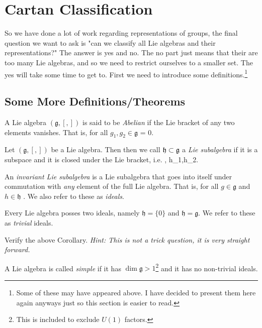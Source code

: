 \section{Cartan Classification}

So we have done a lot of work regarding representations of groups, the final question we want to ask is "can we classify all Lie algebras and their representations?" The answer is yes and no. The no part just means that their are too many Lie algebras, and so we need to restrict ourselves to a smaller set. The yes will take some time to get to. First we need to introduce some definitions.\footnote{Some of these may have appeared above. I have decided to present them here again anyways just so this section is easier to read.}

\subsection{Some More Definitions/Theorems}

    A Lie algebra $(\mathfrak{g},[,])$ is said to be \textit{Abelian} if the Lie bracket of any two elements vanishes. That is, for all $g_1,g_2\in\mathfrak{g}$
    \bse 
        [g_1,g_2] = 0.
    \ese 
\ed 

    Let $(\mathfrak{g},[,])$ be a Lie algebra. Then then we call $\mathfrak{h}\ss \mathfrak{g}$ a \textit{Lie subalgebra} if it is a subspace and it is closed under the Lie bracket, i.e. 
    \bse 
        [h_1,h_2] \in {}, \qquad \forall h_1,h_2\in{}.
    \ese
\ed

    An \textit{invariant Lie subalgebra} is a Lie subalgebra that goes into itself under commutation with \textit{any} element of the full Lie algebra. That is, for all $g\in \mathfrak{g}$ and $h\in\mathfrak{h}$
    \bse 
        [h,g] \in {}.
    \ese
    We also refer to these as \textit{ideals}.
\ed 

\bc 
    Every Lie algebra posses two ideals, namely $\mathfrak{h}=\{0\}$ and $\mathfrak{h}=\mathfrak{g}$. We refer to these as \textit{trivial} ideals. 
\ec

\bbox 
    Verify the above Corollary. \textit{Hint: This is not a trick question, it is very straight forward.}
\ebox 

    A Lie algebra is called \textit{simple} if it has $\dim\mathfrak{g}>1$\footnote{This is included to exclude $U(1)$ factors.} and it has no non-trivial ideals. 
\ed 

